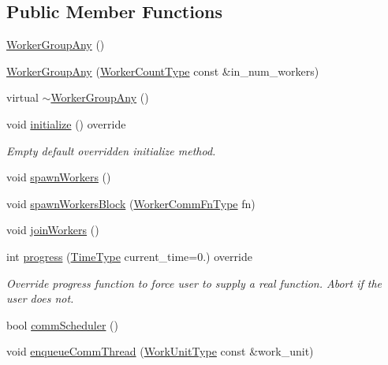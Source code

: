 \subsection*{Public Member Functions}
\begin{DoxyCompactItemize}
\item 
\hyperlink{structvt_1_1worker_1_1_worker_group_any_abe95416ad8e1c0bde799888318491aca}{Worker\+Group\+Any} ()
\item 
\hyperlink{structvt_1_1worker_1_1_worker_group_any_ab3857978c11fd6578d786d0c42a2e784}{Worker\+Group\+Any} (\hyperlink{namespacevt_aa93398ea48f2cb6c188512250f7cc248}{Worker\+Count\+Type} const \&in\+\_\+num\+\_\+workers)
\item 
virtual \hyperlink{structvt_1_1worker_1_1_worker_group_any_a2427146b080679942534b8723475ade3}{$\sim$\+Worker\+Group\+Any} ()
\item 
void \hyperlink{structvt_1_1worker_1_1_worker_group_any_ad8bb855b98bf26337ca13df2bff5fb95}{initialize} () override
\begin{DoxyCompactList}\small\item\em Empty default overridden initialize method. \end{DoxyCompactList}\item 
void \hyperlink{structvt_1_1worker_1_1_worker_group_any_a42edae3e278faf46177ef36719b79e02}{spawn\+Workers} ()
\item 
void \hyperlink{structvt_1_1worker_1_1_worker_group_any_a6175fb131c89db084beda563cf10e4d9}{spawn\+Workers\+Block} (\hyperlink{namespacevt_1_1worker_af5cc6dd44a4444b2e5498ca279a9f04d}{Worker\+Comm\+Fn\+Type} fn)
\item 
void \hyperlink{structvt_1_1worker_1_1_worker_group_any_ac0e40c916ea7620e2985ed29f66a5701}{join\+Workers} ()
\item 
int \hyperlink{structvt_1_1worker_1_1_worker_group_any_a9b71b3e44ee938d873adce83d51dee33}{progress} (\hyperlink{namespacevt_a876a9d0cd5a952859c72de8a46881442}{Time\+Type} current\+\_\+time=0.) override
\begin{DoxyCompactList}\small\item\em Override progress function to force user to supply a real function. Abort if the user does not. \end{DoxyCompactList}\item 
bool \hyperlink{structvt_1_1worker_1_1_worker_group_any_ad935117e72318af02e1554be480d3db6}{comm\+Scheduler} ()
\item 
void \hyperlink{structvt_1_1worker_1_1_worker_group_any_a876ea312a8cefa1caa8bbf86caff208d}{enqueue\+Comm\+Thread} (\hyperlink{namespacevt_1_1worker_a59d2fcdafa81fc0af7f921a258e42202}{Work\+Unit\+Type} const \&work\+\_\+unit)

\end{DoxyCompactItemize}

